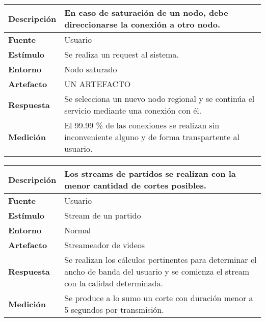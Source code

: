 \begin{center}
  \begin{tabular}{| l | p{10cm} | }
    \hline
	\textbf{Descripción} & En caso de saturación de un nodo, debe direccionarse la conexión a otro nodo.\\  \hline
	\textbf{Fuente} & Usuario\\  \hline
	\textbf{Estímulo} & Se realiza un request al sistema.\\  \hline
	\textbf{Entorno} & Nodo saturado\\  \hline
	\textbf{Artefacto} & UN ARTEFACTO\\  \hline
	\textbf{Respuesta} & Se selecciona un nuevo nodo regional y se continúa el servicio mediante una conexión con él.\\  \hline
	\textbf{Medición} & El 99.99 \% de las conexiones se realizan sin inconveniente alguno y de forma transpartente al usuario.\\  \hline
  \end{tabular}
\end{center} 


\begin{center}
  \begin{tabular}{| l | p{10cm} | }
    \hline
	\textbf{Descripción} & Los streams de partidos se realizan con la menor cantidad de cortes posibles.\\  \hline
	\textbf{Fuente} & Usuario\\  \hline
	\textbf{Estímulo} & Stream de un partido\\  \hline
	\textbf{Entorno} & Normal\\  \hline
	\textbf{Artefacto} & Streameador de videos \\  \hline
	\textbf{Respuesta} & Se realizan los cálculos pertinentes para determinar el ancho de banda del usuario y se comienza el stream con la calidad determinada.\\  \hline
	\textbf{Medición} & Se produce a lo sumo un corte con duración menor a 5 segundos por transmisión.\\  \hline
  \end{tabular}
\end{center}

